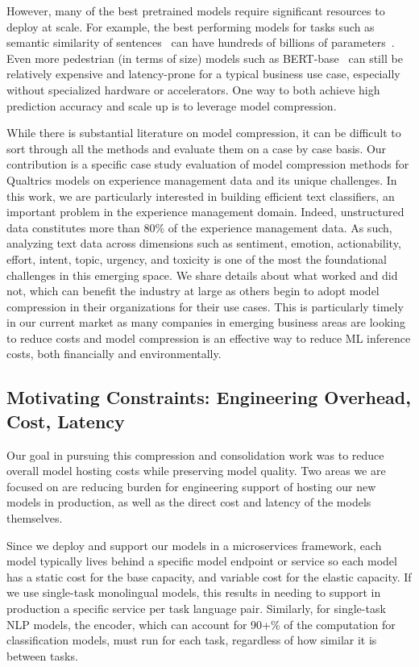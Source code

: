 However, many of the best pretrained models require significant resources to deploy at scale. 
For example, the best performing models for tasks such as semantic similarity of sentences~\cite{wang2018glue} can have hundreds of billions of parameters~\cite{smith2022using}.
Even more pedestrian (in terms of size) models such as BERT-base~\cite{devlin-etal-2019-bert} can still be relatively expensive and latency-prone for a typical business use case, especially without specialized hardware or accelerators.
One way to both achieve high prediction accuracy and scale up is to leverage model compression.

While there is substantial literature on model compression, it can be difficult to sort through all the methods and evaluate them on a case by case basis.
Our contribution is a specific case study evaluation of model compression methods for Qualtrics models on experience management data and its unique challenges.
In this work, we are particularly interested in building efficient text classifiers, an important problem in the experience management domain. 
Indeed, unstructured data constitutes more than 80\% of the experience management data.
As such, analyzing text data across dimensions such as sentiment, emotion, actionability, effort, intent, topic, urgency, and toxicity is one of the most the foundational challenges in this emerging space. 
We share details about what worked and did not, which can benefit the industry at large as others begin to adopt model compression in their organizations for their use cases.
This is particularly timely in our current market as many companies in emerging business areas are looking to reduce costs and model compression is an effective way to reduce ML inference costs, both financially and environmentally.
\subsection{Motivating Constraints: Engineering Overhead, Cost, Latency}
Our goal in pursuing this compression and consolidation work was to reduce overall model hosting costs while preserving model quality.
Two areas we are focused on are reducing burden for engineering support of hosting our new models in production, as well as the direct cost and latency of the models themselves.

Since we deploy and support our models in a microservices framework, each model typically lives behind a specific model endpoint or service so each model has a static cost for the base capacity, and variable cost for the elastic capacity.
If we use single-task monolingual models, this results in needing to support in production a specific service per task language pair.
Similarly, for single-task NLP models, the encoder, which can account for 90+\% of the computation for classification models, must run for each task, regardless of how similar it is between tasks.


